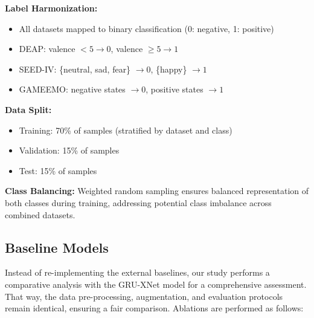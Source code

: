 \documentclass[conference]{IEEEtran}
\begin{document}
\textbf{Label Harmonization:}
\begin{itemize}
    \item All datasets mapped to binary classification (0: negative, 1: positive)
    \item DEAP: valence $< 5 \rightarrow 0$, valence $\geq 5 \rightarrow 1$
    \item SEED-IV: \{neutral, sad, fear\} $\rightarrow 0$, \{happy\} $\rightarrow 1$
    \item GAMEEMO: negative states $\rightarrow 0$, positive states $\rightarrow 1$
\end{itemize}

\textbf{Data Split:}
\begin{itemize}
    \item Training: 70\% of samples (stratified by dataset and class)
    \item Validation: 15\% of samples
    \item Test: 15\% of samples
\end{itemize}

\textbf{Class Balancing:}
Weighted random sampling ensures balanced representation of both classes during training, addressing potential class imbalance across combined datasets.

\subsection{Baseline Models}

Instead of re-implementing the external baselines, our study performs a comparative analysis with the GRU-XNet model for a comprehensive assessment. That way, the data pre-processing, augmentation, and evaluation protocols remain identical, ensuring a fair comparison. Ablations are performed as follows:
\end{document}
